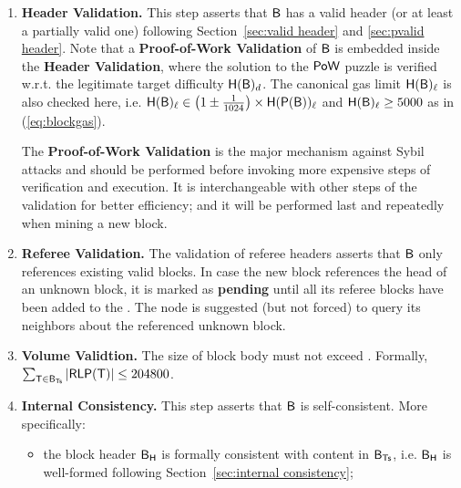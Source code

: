 \begin{enumerate}[]
	\item {\bf Header Validation.} This step asserts that $\textsf{B}$ has a valid header (or at least a partially valid one) following Section~\ref{sec:valid header} and \ref{sec:pvalid header}.
	      Note that a {\bf Proof-of-Work Validation} of $\textsf{B}$ is embedded inside the {\bf Header Validation},
	      where the solution to the $\mathsf{PoW}$ puzzle is verified w.r.t. the legitimate target difficulty $\textsf{H}(\textsf{B})_{d}$. 
	      The canonical gas limit $\textsf{H}(\textsf{B})_{\ell}$ is also checked here, i.e. $\textsf{H}(\textsf{B})_{\ell}\in \left(1\pm \frac{1}{1024}\right)\times \textsf{H}(\mathsf{P}{\left({\textsf{B}} \right)})_{\ell}$ and $\textsf{H}(\textsf{B})_{\ell}\ge {5000}$ as in (\ref{eq:blockgas}).
	      
	      The {\bf Proof-of-Work Validation} is the major mechanism against Sybil attacks and should be performed before invoking more expensive steps of verification and execution.
	      It is interchangeable with 
	      other steps of the validation for better efficiency;
	      and it will be performed last and repeatedly when mining a new block.
	      
	      
	\item {\bf Referee Validation.} The validation of referee headers asserts that $\textsf{B}$ only references existing valid blocks. 
	      In case the new block references the head of an unknown block, it is marked as {\bf pending} until all its referee blocks have been added to the \tg.
	      The node is suggested (but not forced) to query its neighbors about the referenced unknown block.
	      	
	      		      
	
	\item {\bf Volume Validtion.} The size of block body must not exceed \maxblocksize. 
	Formally, $\sum_{\textsf{T}\in\textsf{B}_{\textsf{Ts}}} \left| \mathsf{RLP}(\textsf{T})\right| \le 204800$.

	      
	\item {\bf Internal Consistency.} This step asserts that $\textsf{B}$ is self-consistent.
	      More specifically:
	      \begin{itemize}[nosep]
	      	\item the block header $\textsf{B}_{\textsf{H}}$ is formally consistent with content in $\textsf{B}_{\textsf{Ts}}$,
	      	      i.e. $\textsf{B}_{\textsf{H}}$ is well-formed following Section~\ref{sec:internal consistency};
	      	      

\end{itemize}
\end{enumerate}
